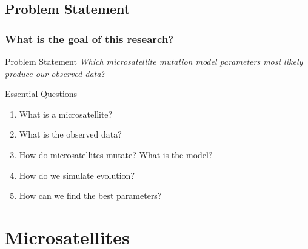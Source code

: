 \documentclass[11pt]{beamer}
\begin{document}
	\subsection{Problem Statement}\label{subsec:ps}
	\begin{frame}
		\frametitle{What is the goal of this research?}
        \begin{block}{Problem Statement}
            \emph{Which microsatellite mutation model parameters most likely produce our observed data?}
        \end{block} \medskip

        \begin{block}{Essential Questions}
            \begin{enumerate}
                \item What is a microsatellite?
                \item What is the observed data?
                \item How do microsatellites mutate?
                    What is the model?
                \item How do we simulate evolution?
                \item How can we find the best parameters?
            \end{enumerate}
        \end{block}

	\end{frame}

	\section{Microsatellites}\label{sec:mi}
\end{document}
